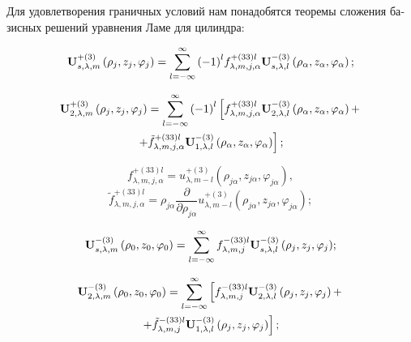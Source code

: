 \begin{russian}
Для удовлетворения граничных условий нам понадобятся теоремы сложения базисных решений уравнения Ламе для цилиндра:

\begin{equation}
{\bf{U}}_{s,\lambda ,m}^{ + (3)}\left( {{\rho _j},{z_j},{\varphi _j}} \right) = \sum\limits_{l =  - \infty }^\infty  {{{( - 1)}^l}} f_{\lambda ,m,j,\alpha }^{ + (33)l}{\bf{U}}_{s,\lambda ,l}^{ - (3)}\left( {{\rho _\alpha },{z_\alpha },{\varphi _\alpha }} \right);
\label{eq:7:7}
\end{equation}

\begin{multline}
{\bf{U}}_{2,\lambda ,m}^{ + (3)}\left( {{\rho _j},{z_j},{\varphi _j}} \right) = \sum\limits_{l =  - \infty }^\infty  {{{( - 1)}^l}} \left[ {f_{\lambda ,m,j,\alpha }^{ + (33)l}{\bf{U}}_{2,\lambda ,l}^{ - (3)}\left( {{\rho _\alpha },{z_\alpha },{\varphi _\alpha }} \right) + } \right.\\
\left. { + \tilde f_{\lambda ,m,j,\alpha }^{ + (33)l}{\bf{U}}_{1,\lambda ,l}^{ - (3)}\left( {{\rho _\alpha },{z_\alpha },{\varphi _\alpha }} \right)} \right];
\label{eq:7:8}
\end{multline}

$$
f_{\lambda ,m,j,\alpha }^{ + (33)l} = u_{\lambda ,m - l}^{ + (3)}\left( {{\rho _{j\alpha }},{z_{j\alpha }},{\varphi _{j\alpha }}} \right),
$$
$$
\tilde f_{\lambda ,m,j,\alpha }^{ + (33)l} = {\rho _{j\alpha }}\frac{\partial }{{\partial {\rho _{j\alpha }}}}u_{\lambda ,m - l}^{ + (3)}\left( {{\rho _{j\alpha }},{z_{j\alpha }},{\varphi _{j\alpha }}} \right);
$$

\begin{equation}
{\bf{U}}_{s,\lambda ,m}^{ - (3)}\left( {{\rho _0},{z_0},{\varphi _0}} \right) = \sum\limits_{l =  - \infty }^\infty  {f_{\lambda ,m,j}^{ - (33)l}{\bf{U}}_{s,\lambda ,l}^{ - (3)}\left( {{\rho _j},{z_j},{\varphi _j}} \right)};
\label{eq:7:9}
\end{equation}

\begin{multline}
{\bf{U}}_{2,\lambda ,m}^{ - (3)}\left( {{\rho _0},{z_0},{\varphi _0}} \right) = \sum\limits_{l =  - \infty }^\infty  {\left[ {f_{\lambda ,m,j}^{ - (33)l}{\bf{U}}_{2,\lambda ,l}^{ - (3)}\left( {{\rho _j},{z_j},{\varphi _j}} \right) + } \right.} \\
\left. { + \tilde f_{\lambda ,m,j}^{ - (33)l}{\bf{U}}_{1,\lambda ,l}^{ - (3)}\left( {{\rho _j},{z_j},{\varphi _j}} \right)} \right];
\label{eq:7:10}
\end{multline}


\end{russian}

